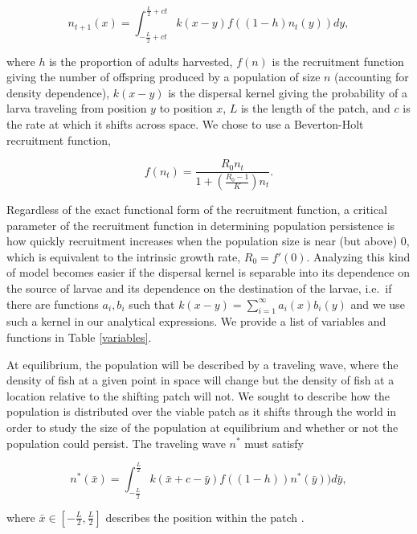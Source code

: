 \documentclass[12pt,english]{article}
\begin{document}
\begin{spacing}{1.9}
\begin{flushleft}
\begin{equation*}
n_{t+1}(x)=\int^{\frac{L}{2}+ct}_{-\frac{L}{2}+ct}k(x-y)f((1-h)n_t(y))dy \label{integrodifference},
\end{equation*}

\noindent where $h$ is the proportion of adults harvested, $f(n)$ is the recruitment function giving the number of 
offspring produced by a population of size $n$ (accounting for density dependence), $k(x-y)$ is the dispersal kernel giving the probability of a  larva traveling from position $y$ to position $x$, $L$ is the length of the patch, and $c$ is the rate at which it  shifts across space.  We chose to use a Beverton-Holt recruitment function,

\[f(n_t)=\frac{R_0n_t}{1+\left(\frac{R_0-1}{K}\right)n_t}.\]  

\noindent Regardless of the exact functional form of the recruitment function, a critical parameter of the recruitment function in determining population persistence is how quickly recruitment increases when the population 
size is near (but above) $0$, which is equivalent to the intrinsic growth rate, $R_0=f'(0)$.  Analyzing this kind of model becomes easier if the dispersal kernel is separable into its dependence on the source of larvae and its dependence on the destination of the larvae, i.e.~if there are functions $a_i, b_i$ such that $k(x- y) = \sum^\infty_{i=1} a_i(x)b_i(y)$ and we use such a kernel in our analytical expressions. We provide a list of variables and functions in Table \ref{variables}. 

At equilibrium, the population will be described by a traveling wave, 
where the density of fish at a given point in space will change but the density of fish at a location relative to the 
shifting  patch will not. We sought to describe how the population is distributed over the viable 
patch as it shifts through the world in order to study the size of the population at equilibrium and whether or not the population could persist.  The traveling wave $n^*$ must 
satisfy

\begin{equation}
n^*(\bar{x})=\int^{\frac{L}{2}}_{-\frac{L}{2}}k(\bar{x}+c-\bar{y})f((1-h))n^*(\bar{y}))d
\bar{y}, \label{traveling_pulse}
\end{equation}

\noindent where $\bar{x}\in\left[-\frac{L}{2}, \frac{L}{2}\right]$ describes the position within the patch \citep{ZhouKot2011}.


\end{flushleft}
\end{spacing}
\end{document}
